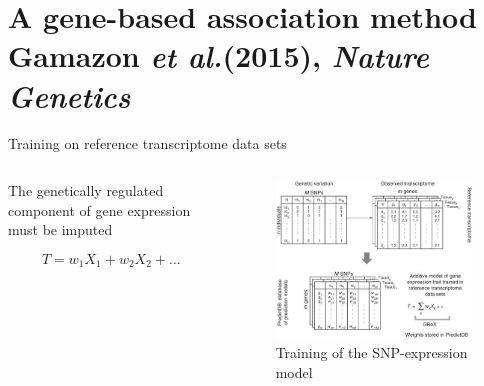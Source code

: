 \documentclass[aspectratio=169,12pt]{beamer}
\newcommand{\etal}{\textit{et al.}\xspace}
\begin{document}
\section{A gene-based association method \newline
\scriptsize Gamazon \etal (2015), \textit{Nature Genetics}}

\begin{frame}{Training on reference transcriptome data sets}
	
	\begin{columns}
		\begin{column}{0.4\textwidth}
			The genetically regulated component of gene expression must 
be imputed

			\begin{equation*}
				T = w_1 X_1 + w_2 X_2 + \ldots
			\end{equation*}
		\end{column}

		\begin{column}{0.6\textwidth}
			\begin{figure}
				\includegraphics[width=\textwidth]{gamazon2015/2-grex_estimation_part1}
				\caption{Training of the SNP-expression model}
			\end{figure}
		\end{column}
	\end{columns}


\end{frame}
\end{document}

